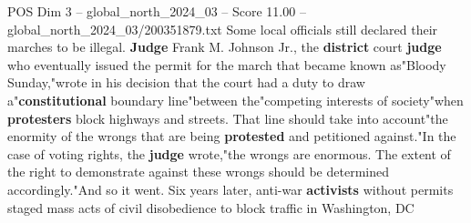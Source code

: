 \begin{textsample}{POS Dim 3 – global\_north\_2024\_03 – Score 11.00 – global\_north\_2024\_03/200351879.txt}
Some local officials still declared their marches to be illegal. \textbf{Judge} Frank M.
Johnson Jr., the \textbf{district} court \textbf{judge} who eventually issued the permit for the march that became known as"Bloody Sunday,"wrote in his decision that the court had a duty to draw a"\textbf{constitutional} boundary line"between the"competing interests of society"when \textbf{protesters} block highways and streets.
That line should take into account"the enormity of the wrongs that are being \textbf{protested} and petitioned against."In the case of voting rights, the \textbf{judge} wrote,"the wrongs are enormous.
The extent of the right to demonstrate against these wrongs should be determined accordingly."And so it went.
Six years later, anti-war \textbf{activists} without permits staged mass acts of civil disobedience to block traffic in Washington, DC

\end{textsample}
